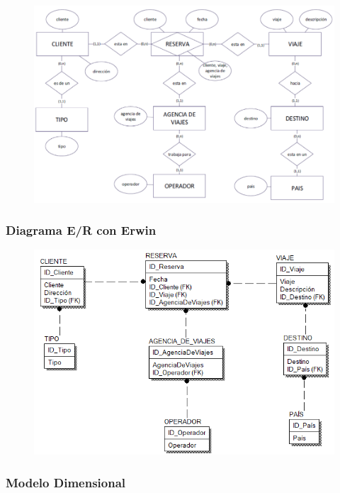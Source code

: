 \documentclass{article}
\begin{document}
	\begin{figure}[htb]
		\begin{center}
			\includegraphics[width=11.5cm]{./images/Ejercicio_2}
			
		\end{center}
	\end{figure}

\subsubsection{\textbf{Diagrama E/R con Erwin}}

	\begin{figure}[htb]
		\begin{center}
			\includegraphics[width=12cm]{./images/erwin_2}
			
		\end{center}
	\end{figure}

\newpage

\subsubsection{\textbf{Modelo Dimensional }}
\end{document}
